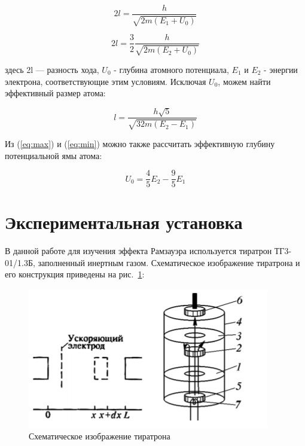 \documentclass[reprint, nofootinbib, nobalancelastpage, 10pt]{revtex4-2}
\begin{document}
\begin{equation}
    \label{eq:max}
	2l = \frac{h}{\sqrt{2m(E_1 + U_0)}}
\end{equation} 

\begin{equation}
    \label{eq:min}
	2l = \frac{3}{2}\frac{h}{\sqrt{2m(E_2 + U_0)}}
\end{equation}

здесь 2l --- разность хода, $U_0$ - глубина атомного потенциала, $E_1$ и $E_2$ - энергии
электрона, соответствующие этим условиям. Исключая $U_0$, можем найти эффективный размер атома:

\begin{equation}
    \label{eq:l_main}
	l = \frac{h\sqrt{5}}{\sqrt{32m(E_2 - E_1)}}
\end{equation}

Из (\ref{eq:max}) и (\ref{eq:min}) можно также рассчитать эффективную глубину потенциальной ямы атома:

\begin{equation}
    \label{eq:u}
	U_0 = \frac{4}{5}E_2 - \frac{9}{5}E_1
\end{equation}


\section*{Экспериментальная установка}

В данной работе для изучения эффекта Рамзауэра используется тиратрон ТГ3-01/1.3Б,
заполненный инертным газом. Схематическое изображение тиратрона и его конструкция
приведены на рис.~\ref{img:pic4}:

\begin{figure}[h]
	\includegraphics[width = \linewidth]{pic_4.png}
	\caption{Схематическое изображение тиратрона}
	\label{img:pic4}
\end{figure}
\end{document}
